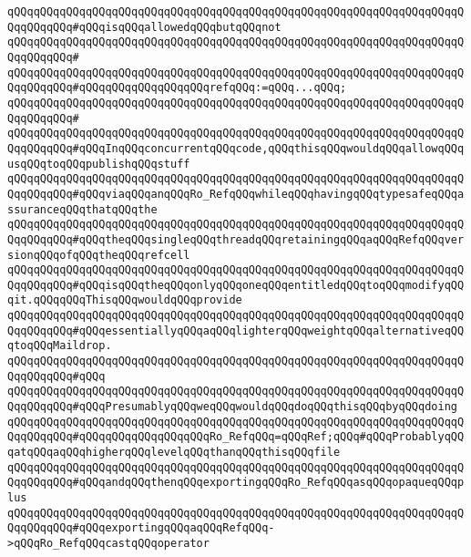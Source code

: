 \verb|qQQqqQQqqQQqqQQqqQQqqQQqqQQqqQQqqQQqqQQqqQQqqQQqqQQqqQQqqQQqqQQqqQQqqQQqqQQqqQQq#qQQqisqQQqallowedqQQqbutqQQqnot|\newline
\verb|qQQqqQQqqQQqqQQqqQQqqQQqqQQqqQQqqQQqqQQqqQQqqQQqqQQqqQQqqQQqqQQqqQQqqQQqqQQqqQQq#|\newline
\verb|qQQqqQQqqQQqqQQqqQQqqQQqqQQqqQQqqQQqqQQqqQQqqQQqqQQqqQQqqQQqqQQqqQQqqQQqqQQqqQQq#qQQqqQQqqQQqqQQqqQQqrefqQQq:=qQQq...qQQq;|\newline
\verb|qQQqqQQqqQQqqQQqqQQqqQQqqQQqqQQqqQQqqQQqqQQqqQQqqQQqqQQqqQQqqQQqqQQqqQQqqQQqqQQq#|\newline
\verb|qQQqqQQqqQQqqQQqqQQqqQQqqQQqqQQqqQQqqQQqqQQqqQQqqQQqqQQqqQQqqQQqqQQqqQQqqQQqqQQq#qQQqInqQQqconcurrentqQQqcode,qQQqthisqQQqwouldqQQqallowqQQqusqQQqtoqQQqpublishqQQqstuff|\newline
\verb|qQQqqQQqqQQqqQQqqQQqqQQqqQQqqQQqqQQqqQQqqQQqqQQqqQQqqQQqqQQqqQQqqQQqqQQqqQQqqQQq#qQQqviaqQQqanqQQqRo_RefqQQqwhileqQQqhavingqQQqtypesafeqQQqassuranceqQQqthatqQQqthe|\newline
\verb|qQQqqQQqqQQqqQQqqQQqqQQqqQQqqQQqqQQqqQQqqQQqqQQqqQQqqQQqqQQqqQQqqQQqqQQqqQQqqQQq#qQQqtheqQQqsingleqQQqthreadqQQqretainingqQQqaqQQqRefqQQqversionqQQqofqQQqtheqQQqrefcell|\newline
\verb|qQQqqQQqqQQqqQQqqQQqqQQqqQQqqQQqqQQqqQQqqQQqqQQqqQQqqQQqqQQqqQQqqQQqqQQqqQQqqQQq#qQQqisqQQqtheqQQqonlyqQQqoneqQQqentitledqQQqtoqQQqmodifyqQQqit.qQQqqQQqThisqQQqwouldqQQqprovide|\newline
\verb|qQQqqQQqqQQqqQQqqQQqqQQqqQQqqQQqqQQqqQQqqQQqqQQqqQQqqQQqqQQqqQQqqQQqqQQqqQQqqQQq#qQQqessentiallyqQQqaqQQqlighterqQQqweightqQQqalternativeqQQqtoqQQqMaildrop.|\newline
\verb|qQQqqQQqqQQqqQQqqQQqqQQqqQQqqQQqqQQqqQQqqQQqqQQqqQQqqQQqqQQqqQQqqQQqqQQqqQQqqQQq#qQQq|\newline
\verb|qQQqqQQqqQQqqQQqqQQqqQQqqQQqqQQqqQQqqQQqqQQqqQQqqQQqqQQqqQQqqQQqqQQqqQQqqQQqqQQq#qQQqPresumablyqQQqweqQQqwouldqQQqdoqQQqthisqQQqbyqQQqdoing|\newline
\verb|qQQqqQQqqQQqqQQqqQQqqQQqqQQqqQQqqQQqqQQqqQQqqQQqqQQqqQQqqQQqqQQqqQQqqQQqqQQqqQQq#qQQqqQQqqQQqqQQqqQQqRo_RefqQQq=qQQqRef;qQQq#qQQqProbablyqQQqatqQQqaqQQqhigherqQQqlevelqQQqthanqQQqthisqQQqfile|\newline
\verb|qQQqqQQqqQQqqQQqqQQqqQQqqQQqqQQqqQQqqQQqqQQqqQQqqQQqqQQqqQQqqQQqqQQqqQQqqQQqqQQq#qQQqandqQQqthenqQQqexportingqQQqRo_RefqQQqasqQQqopaqueqQQqplus|\newline
\verb|qQQqqQQqqQQqqQQqqQQqqQQqqQQqqQQqqQQqqQQqqQQqqQQqqQQqqQQqqQQqqQQqqQQqqQQqqQQqqQQq#qQQqexportingqQQqaqQQqRefqQQq->qQQqRo_RefqQQqcastqQQqoperator|\newline
